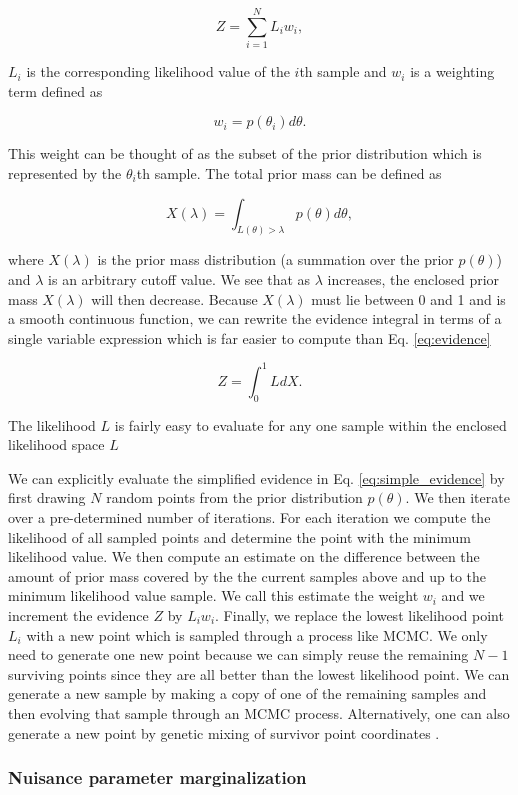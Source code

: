 \begin{equation}
    Z = \sum_{i=1}^{N} L_i w_i,
\end{equation}

$L_i$ is the corresponding likelihood value of the $i$th sample and $w_i$ is a weighting term defined as

\begin{equation}
    w_i = p(\theta_i) d\theta.
\end{equation}

This weight can be thought of as the subset of the prior distribution which is represented by the $\theta_i$th sample. The total prior mass can be defined as

\begin{equation}
    X(\lambda) = \int_{L(\theta) > \lambda} p(\theta) d\theta,
\end{equation}

where $X(\lambda)$ is the prior mass distribution (a summation over the prior $p(\theta)$) and $\lambda$ is an arbitrary cutoff value. We see that as $\lambda$ increases, the enclosed prior mass $X(\lambda)$ will then decrease. Because $X(\lambda)$ must lie between 0 and 1 and is a smooth continuous function, we can rewrite the evidence integral in terms of a single variable expression which is far easier to compute than Eq. \ref{eq:evidence}

\begin{equation}
    Z = \int_{0}^{1} L dX. \label{eq:simple_evidence}
\end{equation}

The likelihood $L$ is fairly easy to evaluate for any one sample within the enclosed likelihood space $L$ 

We can explicitly evaluate the simplified evidence in Eq. \ref{eq:simple_evidence} by first drawing $N$ random points from the prior distribution $p(\theta)$. We then iterate over a pre-determined number of iterations. For each iteration we compute the likelihood of all sampled points and determine the point with the minimum likelihood value. We then compute an estimate on the difference between the amount of prior mass covered by the the current samples above and up to the minimum likelihood value sample. We call this estimate the weight $w_i$ and we increment the evidence $Z$ by $L_i w_i$. Finally, we replace the lowest likelihood point $L_i$ with a new point which is sampled through a process like \ac{MCMC}. We only need to generate one new point because we can simply reuse the remaining $N-1$ surviving points since they are all better than the lowest likelihood point. We can generate a new sample by making a copy of one of the remaining samples and then evolving that sample through an \ac{MCMC} process. Alternatively, one can also generate a new point by genetic mixing of survivor point coordinates \cite{skilling2006}.

%
%

\subsubsection{Nuisance parameter marginalization}